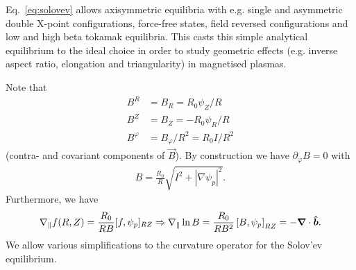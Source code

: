 Eq.~\eqref{eq:solovev} allows axisymmetric equilibria with e.g. single and asymmetric double X-point configurations, force-free states,
field reversed configurations and low and high beta tokamak equilibria. This casts this simple analytical equilibrium to the ideal choice in order to study geometric effects (e.g. inverse aspect ratio, elongation and triangularity) in magnetised plasmas.

Note that
\begin{align}
    B^R&=B_R = R_0\psi_Z/R \\
    B^Z&=B_Z = - R_0\psi_R/R \\
    B^\varphi &= B_\varphi/R^2 = R_0I/R^2
\end{align}
(contra- and covariant components of $\vec B$).
By construction we have $\partial_\varphi B = 0$ with
\begin{align}
  B = \frac{R_0}{R}\sqrt{ {I^2 + |\nabla \psi_p|^2}}.
    \label{}
\end{align}
Furthermore, we have
\begin{align}
  \nabla_\parallel f(R,Z) = \frac{R_0}{RB}[f,\psi_p]_{RZ}\Rightarrow \nabla_\parallel \ln B = \frac{R_0}{RB^2}\left[B, \psi_p\right]_{RZ} = -{\boldsymbol{\nabla}}\cdot\bm{\hat{b}}.
\end{align}
We allow various simplifications to the curvature operator
for the Solov'ev equilibrium.


